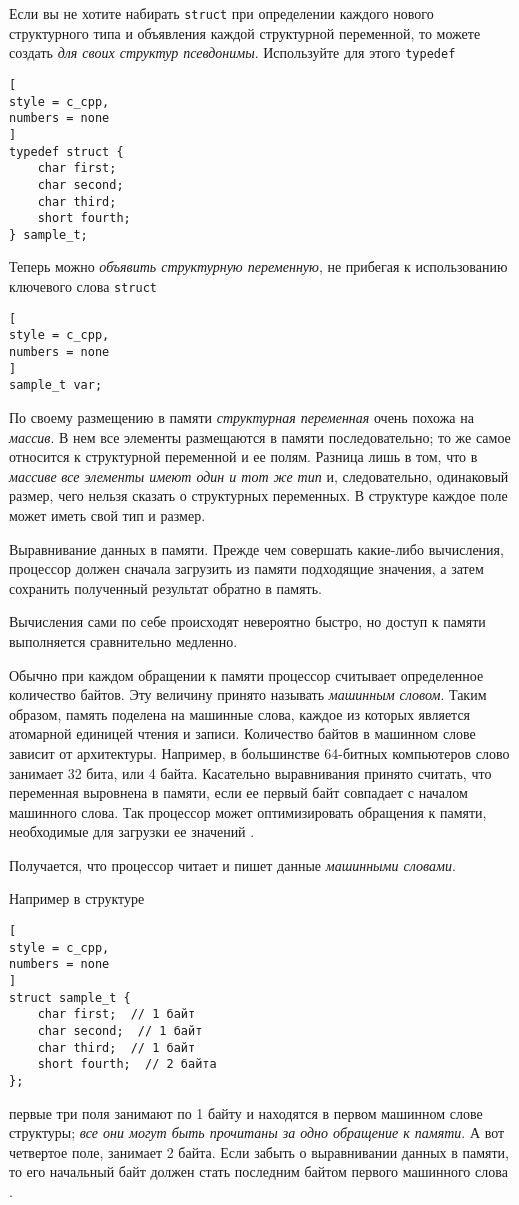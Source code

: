 \documentclass[%
	11pt,
	a4paper,
	utf8,
		]{article}
\begin{document}
Если вы не хотите набирать \verb|struct| при определении каждого нового структурного типа и объявления каждой структурной переменной, то можете создать \emph{для своих структур псевдонимы}. Используйте для этого \verb|typedef|
\begin{lstlisting}[
style = c_cpp,
numbers = none
]
typedef struct {
    char first;
    char second;
    char third;
    short fourth;
} sample_t;
\end{lstlisting}

Теперь можно \emph{объявить структурную переменную}, не прибегая к использованию ключевого слова \verb|struct|
\begin{lstlisting}[
style = c_cpp,
numbers = none	
]
sample_t var;
\end{lstlisting}

По своему размещению в памяти \emph{структурная переменная} очень похожа на \emph{массив}. В нем все элементы размещаются в памяти последовательно; то же самое относится к структурной переменной и ее полям. Разница лишь в том, что в \emph{массиве} \emph{все элементы имеют один и тот же тип} и, следовательно, одинаковый размер, чего нельзя сказать о структурных переменных. В структуре каждое поле может иметь свой тип и размер.

Выравнивание данных в памяти. Прежде чем совершать какие-либо вычисления, процессор должен сначала загрузить из памяти подходящие значения, а затем сохранить полученный результат обратно в память. 

Вычисления сами по себе происходят невероятно быстро, но доступ к памяти выполняется сравнительно медленно.

Обычно при каждом обращении к памяти процессор считывает определенное количество байтов. Эту величину принято называть \emph{машинным словом}. Таким образом, память поделена на машинные слова, каждое из которых является атомарной единицей чтения и записи. Количество байтов в машинном слове зависит от архитектуры. Например, в большинстве 64-битных компьютеров слово занимает 32 бита, или 4 байта. Касательно выравнивания принято считать, что переменная выровнена в памяти, если ее первый байт совпадает с началом машинного слова. Так процессор может оптимизировать обращения к памяти, необходимые для загрузки ее значений \cite[]{amini-extreme-c:2022}.

Получается, что процессор читает и пишет данные \emph{машинными словами}.

Например в структуре
\begin{lstlisting}[
style = c_cpp,
numbers = none
]
struct sample_t {
    char first;  // 1 байт
    char second;  // 1 байт
    char third;  // 1 байт
    short fourth;  // 2 байта
};
\end{lstlisting}
первые три поля занимают по 1 байту и находятся в первом машинном слове структуры; \emph{все они могут быть прочитаны за одно обращение к памяти}. А вот четвертое поле, занимает 2 байта. Если забыть о выравнивании данных в памяти, то его начальный байт должен стать последним байтом первого машинного слова \cite[]{amini-extreme-c:2022}.
\end{document}
